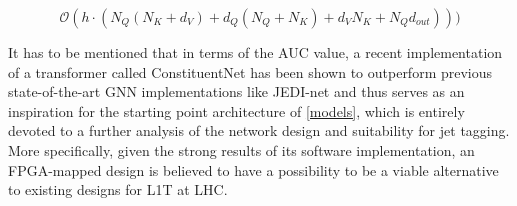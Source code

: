 \begin{equation}\label{eq:qkv-complexity-space}
  \mathcal{O}(h \cdot (N_Q (N_K + d_V) + d_Q (N_Q + N_K) + d_V N_K + N_Q d_{out}) ))
\end{equation}

It has to be mentioned that in terms of the AUC value, a recent implementation of a transformer called ConstituentNet \cite{3-yuan2021constituentnet:} has been shown to outperform previous state-of-the-art GNN implementations like JEDI-net \cite{9-newman2019jedi-net:} and thus serves as an inspiration for the starting point architecture of \cref{models}, which is entirely devoted to a further analysis of the network design and suitability for jet tagging. More specifically, given the strong results of its software implementation, an FPGA-mapped design is believed to have a possibility to be a viable alternative to existing designs for L1T at LHC.